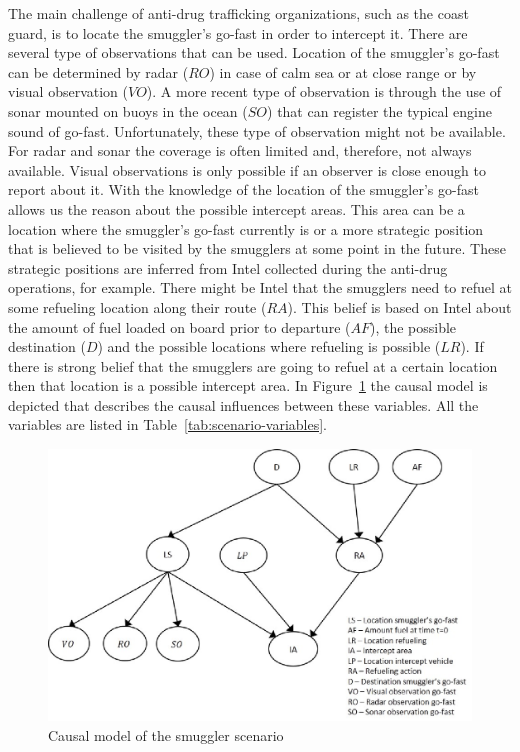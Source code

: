 \documentclass[conference]{IEEEtran}
\begin{document}
The main challenge of anti-drug trafficking organizations, such as the coast guard, is to locate the smuggler's go-fast in order to intercept it. There are several type of observations that can be used. Location of the smuggler's go-fast can be determined by radar ($RO$) in case of calm sea or at close range or by visual observation ($VO$). A more recent type of observation is through the use of sonar mounted on buoys in the ocean ($SO$) that can register the typical engine sound of go-fast. Unfortunately, these type of observation might not be available. For radar and sonar the coverage is often limited and, therefore, not always available. Visual observations is only possible if an observer is close enough to report about it. With the knowledge of the location of the smuggler's go-fast allows us the reason about the possible intercept areas. This area can be a location where the smuggler's go-fast currently is or a more strategic position that is believed to be visited by the smugglers at some point in the future. These strategic positions are inferred from Intel collected during the anti-drug operations, for example. There might be Intel that the smugglers need to refuel at some refueling location along their route ($RA$). This belief is based on Intel about the amount of fuel loaded on board prior to departure ($AF$), the possible destination ($D$) and the possible locations where refueling is possible ($LR$). If there is strong belief that the smugglers are going to refuel at a certain location then that location is a possible intercept area. In Figure~\ref{fig:causal-model} the causal model is depicted that describes the causal influences between these variables. All the variables are listed in Table~\ref{tab:scenario-variables}.


\begin{figure}
\begin{center}
 \includegraphics[width=.4\textwidth]{img/causal-model.eps}
 \caption{Causal model of the smuggler scenario}\label{fig:causal-model}
\end{center}
\end{figure}
\end{document}
